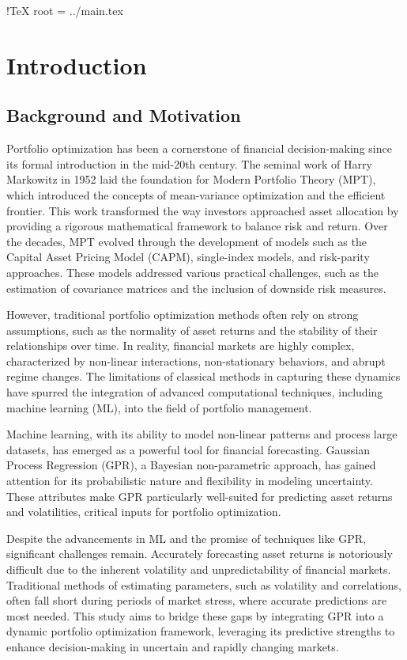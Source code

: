 !TeX root = ../main.tex

\chapter{Introduction}\label{chapter:introduction}

\section{Background and Motivation}
Portfolio optimization has been a cornerstone of financial decision-making since its formal introduction in the mid-20th century. The seminal work of Harry Markowitz in 1952 laid the foundation for Modern Portfolio Theory (MPT), which introduced the concepts of mean-variance optimization and the efficient frontier. This work transformed the way investors approached asset allocation by providing a rigorous mathematical framework to balance risk and return. Over the decades, MPT evolved through the development of models such as the Capital Asset Pricing Model (CAPM), single-index models, and risk-parity approaches. These models addressed various practical challenges, such as the estimation of covariance matrices and the inclusion of downside risk measures.

However, traditional portfolio optimization methods often rely on strong assumptions, such as the normality of asset returns and the stability of their relationships over time. In reality, financial markets are highly complex, characterized by non-linear interactions, non-stationary behaviors, and abrupt regime changes. The limitations of classical methods in capturing these dynamics have spurred the integration of advanced computational techniques, including machine learning (ML), into the field of portfolio management.

Machine learning, with its ability to model non-linear patterns and process large datasets, has emerged as a powerful tool for financial forecasting. Gaussian Process Regression (GPR), a Bayesian non-parametric approach, has gained attention for its probabilistic nature and flexibility in modeling uncertainty. These attributes make GPR particularly well-suited for predicting asset returns and volatilities, critical inputs for portfolio optimization.

Despite the advancements in ML and the promise of techniques like GPR, significant challenges remain. Accurately forecasting asset returns is notoriously difficult due to the inherent volatility and unpredictability of financial markets. Traditional methods of estimating parameters, such as volatility and correlations, often fall short during periods of market stress, where accurate predictions are most needed. This study aims to bridge these gaps by integrating GPR into a dynamic portfolio optimization framework, leveraging its predictive strengths to enhance decision-making in uncertain and rapidly changing markets.

